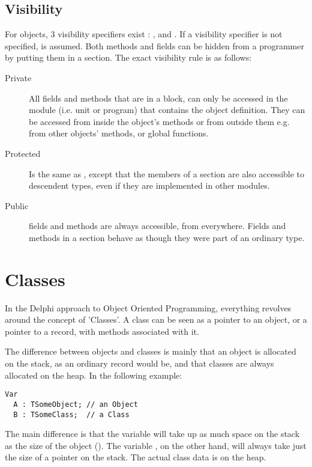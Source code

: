 \section{Visibility}
For objects, 3 visibility specifiers exist : ,  and
. If a visibility specifier is not specified, 
is assumed.
Both methods and fields can be hidden from a programmer by putting them
in a  section. The exact visibility rule is as follows:
\begin{description}
\item [Private\ ] All fields and methods that are in a  block,
can  only be accessed in the module (i.e. unit or program) that contains
the object definition.
They can be accessed from inside the object's methods or from outside them
e.g. from other objects' methods, or global functions.
\item [Protected\ ] Is the same as , except that the members of
a  section are also accessible to descendent types, even if
they are implemented in other modules.
\item [Public\ ] fields and methods are always accessible, from everywhere.
Fields and methods in a  section behave as though they were part
of an ordinary  type.
\end{description}

\chapter{Classes}
\label{ch:Classes}
In the Delphi approach to Object Oriented Programming, everything revolves
around  the concept of 'Classes'.  A class can be seen as a pointer to an
object, or a pointer to a record, with methods associated with it.

The difference between objects and classes is mainly that an object
is allocated on the stack, as an ordinary record would be, and that
classes are always allocated on the heap. In the following example:
\begin{verbatim}
Var
  A : TSomeObject; // an Object
  B : TSomeClass;  // a Class
\end{verbatim}
The main difference is that the variable  will take up as much 
space on the stack as the size of the object (). The
variable , on the other hand, will always take just the size of
a pointer on the stack. The actual class data is on the heap.

